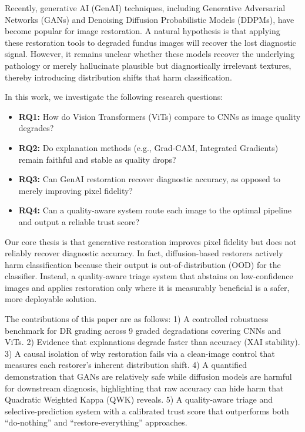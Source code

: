 \documentclass[conference]{IEEEtran}
\begin{document}
Recently, generative AI (GenAI) techniques, including Generative Adversarial Networks (GANs) and Denoising Diffusion Probabilistic Models (DDPMs), have become popular for image restoration. A natural hypothesis is that applying these restoration tools to degraded fundus images will recover the lost diagnostic signal. However, it remains unclear whether these models recover the underlying pathology or merely hallucinate plausible but diagnostically irrelevant textures, thereby introducing distribution shifts that harm classification.

In this work, we investigate the following research questions:
\begin{itemize}
    \item \textbf{RQ1:} How do Vision Transformers (ViTs) compare to CNNs as image quality degrades?
    \item \textbf{RQ2:} Do explanation methods (e.g., Grad-CAM, Integrated Gradients) remain faithful and stable as quality drops?
    \item \textbf{RQ3:} Can GenAI restoration recover diagnostic accuracy, as opposed to merely improving pixel fidelity?
    \item \textbf{RQ4:} Can a quality-aware system route each image to the optimal pipeline and output a reliable trust score?
\end{itemize}

Our core thesis is that generative restoration improves pixel fidelity but does not reliably recover diagnostic accuracy. In fact, diffusion-based restorers actively harm classification because their output is out-of-distribution (OOD) for the classifier. Instead, a quality-aware triage system that abstains on low-confidence images and applies restoration only where it is measurably beneficial is a safer, more deployable solution.

The contributions of this paper are as follows:
1) A controlled robustness benchmark for DR grading across 9 graded degradations covering CNNs and ViTs.
2) Evidence that explanations degrade faster than accuracy (XAI stability).
3) A causal isolation of why restoration fails via a clean-image control that measures each restorer's inherent distribution shift.
4) A quantified demonstration that GANs are relatively safe while diffusion models are harmful for downstream diagnosis, highlighting that raw accuracy can hide harm that Quadratic Weighted Kappa (QWK) reveals.
5) A quality-aware triage and selective-prediction system with a calibrated trust score that outperforms both ``do-nothing'' and ``restore-everything'' approaches.
\end{document}
